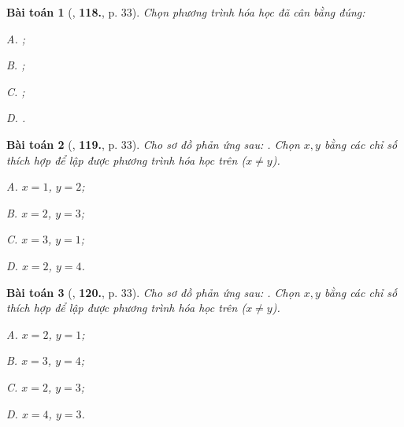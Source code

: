 \documentclass{article}
\numberwithin{equation}{section}
\newtheorem{baitoan}{Bài toán}
\begin{document}
\begin{baitoan}[\cite{An2011}, \textbf{118.}, p. 33]
	Chọn phương trình hóa học đã cân bằng đúng:
	\begin{enumerate*}
		\item[{\rm\sf A.}] \emph{};
		\item[{\rm\sf B.}] \emph{};
		\item[{\rm\sf C.}] \emph{};
		\item[{\rm\sf D.}] \emph{}.
	\end{enumerate*}
\end{baitoan}

\begin{baitoan}[\cite{An2011}, \textbf{119.}, p. 33]
	Cho sơ đồ phản ứng sau: \emph{}. Chọn $x,y$ bằng các chỉ số thích hợp để lập được phương trình hóa học trên ($x\ne y$).
	\begin{enumerate*}
		\item[{\rm\sf A.}] $x = 1$, $y = 2$;
		\item[{\rm\sf B.}] $x = 2$, $y = 3$;
		\item[{\rm\sf C.}] $x = 3$, $y = 1$;
		\item[{\rm\sf D.}] $x = 2$, $y = 4$.
	\end{enumerate*}
\end{baitoan}

\begin{baitoan}[\cite{An2011}, \textbf{120.}, p. 33]
	Cho sơ đồ phản ứng sau: \emph{}. Chọn $x,y$ bằng các chỉ số thích hợp để lập được phương trình hóa học trên ($x\ne y$).
	\begin{enumerate*}
		\item[{\rm\sf A.}] $x = 2$, $y = 1$;
		\item[{\rm\sf B.}] $x = 3$, $y = 4$;
		\item[{\rm\sf C.}] $x = 2$, $y = 3$;
		\item[{\rm\sf D.}] $x = 4$, $y = 3$.
	\end{enumerate*}
\end{baitoan}


\printbibliography[heading=bibintoc]
	
\end{document}
